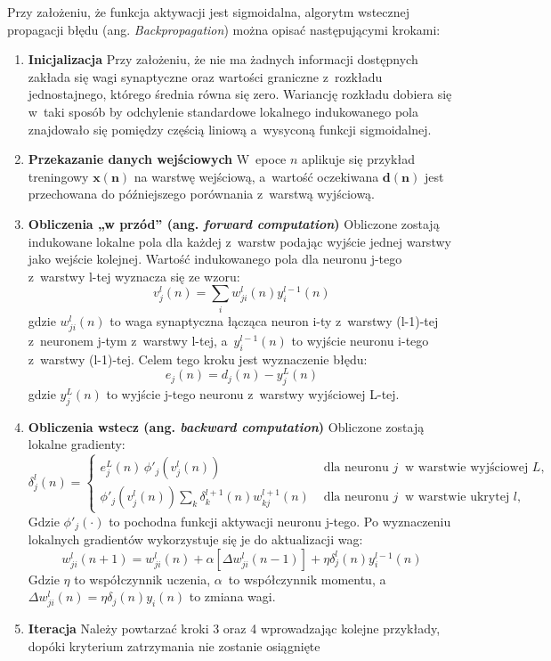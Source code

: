 \begin{tcolorbox}[title=Algorytm wstecznej propagacji błędu (ang. \textit{Backpropagation}),
    colback=blue!5!white,colframe=blue!75!black,
    breakable]
    
Przy założeniu, że funkcja aktywacji jest sigmoidalna, algorytm wstecznej propagacji błędu (ang. \textit{Backpropagation}) można opisać następującymi krokami:\cite{haykin2009neural}
    \begin{enumerate}
        \item \textbf{Inicjalizacja} 
        Przy założeniu, że nie ma żadnych informacji dostępnych zakłada się wagi synaptyczne oraz wartości graniczne z~rozkładu jednostajnego, którego średnia równa się zero. Wariancję rozkładu dobiera się w~taki sposób by odchylenie standardowe lokalnego indukowanego pola znajdowało się pomiędzy częścią liniową a~wysyconą funkcji sigmoidalnej.
        \item \textbf{Przekazanie danych wejściowych} 
        W~epoce $n$ aplikuje się przykład treningowy $\mathbf{x(n)}$ na warstwę wejściową, a~wartość oczekiwana $\mathbf{d(n)}$ jest przechowana do późniejszego porównania z~warstwą wyjściową.
        \item \textbf{Obliczenia „w przód” (ang. \textit{forward computation})} 
        Obliczone zostają indukowane lokalne pola dla każdej z~warstw podając wyjście jednej warstwy jako wejście kolejnej. Wartość indukowanego pola dla neuronu j-tego z~warstwy l-tej wyznacza się ze wzoru: 
        \[v_j^l(n)=\sum_i{w_{ji}^l(n)y_i^{l-1}(n)}\]
        gdzie $w_{ji}^l(n)$ to waga synaptyczna łącząca neuron i-ty z~warstwy (l-1)-tej z~neuronem j-tym z~warstwy l-tej, a~$y_i^{l-1}(n)$ to wyjście neuronu i-tego z~warstwy (l-1)-tej.
        Celem tego kroku jest wyznaczenie błędu:
        \[e_j(n) = d_j(n) - y_j^L(n)\]
        gdzie $y_j^L(n)$ to wyjście j-tego neuronu z~warstwy wyjściowej L-tej.
        \item \textbf{Obliczenia wstecz (ang. \textit{backward computation})}
        Obliczone zostają lokalne gradienty: 
        \[
            \delta_j^l(n) =
            \begin{cases}
            e_j^L(n)\,\phi'_j(v_j^l(n)) & \text{ dla neuronu } j~\text{ w~warstwie wyjściowej } L, \\
            \phi'_j(v_j^l(n))\sum_k {\delta_k^{l+1}(n)w_{kj}^{l+1}(n)} & \text{ dla neuronu } j~\text{ w~warstwie ukrytej } l,
            \end{cases}
        \]
        Gdzie $\phi'_j(\cdot)$ to pochodna funkcji aktywacji neuronu j-tego.
        Po wyznaczeniu lokalnych gradientów wykorzystuje się je do aktualizacji wag:
        \[w_{ji}^l(n+1)=w_{ji}^l(n) +\alpha\left[\Delta w_{ji}^l(n-1) \right] +\eta \delta_j^l(n)y_i^{l-1}(n) \]
        Gdzie $\eta$ to współczynnik uczenia, $\alpha$~to współczynnik momentu, a~$\Delta w_{ji}^l(n) = \eta\delta_j(n)y_i(n)$ to zmiana wagi.
        \item \textbf{Iteracja}
        Należy powtarzać kroki 3 oraz 4 wprowadzając kolejne przykłady, dopóki kryterium zatrzymania nie zostanie osiągnięte
    \end{enumerate}

\end{tcolorbox}

